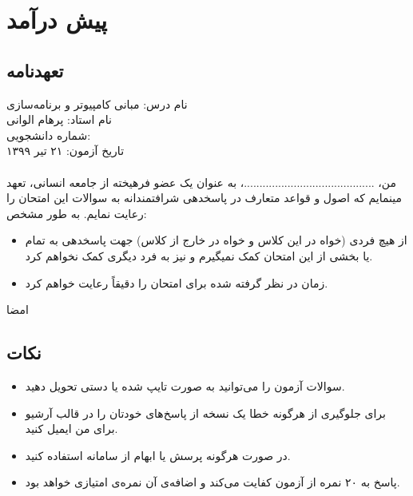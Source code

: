 \documentclass[../main.tex]{subfiles}
\begin{document}
\section{پیش درآمد}
\subsection{تعهدنامه}
نام درس:‌ مبانی کامپیوتر و برنامه‌سازی\\
نام استاد:‌ پرهام الوانی\\
شماره دانشجویی:‌ \hspace{2em}\\
تاریخ آزمون:‌ ۲۱ تیر ۱۳۹۹

\paragraph{}
من، ..........................................، به عنوان یک عضو فرهیخته از جامعه انسانی، تعهد مینمایم که اصول و قواعد متعارف در پاسخدهی
شرافتمندانه به سوالات این امتحان را رعایت نمایم. به طور مشخص:

\begin{itemize}
    \item  از هیچ فردی (خواه در این کلاس و خواه در خارج از کلاس) جهت پاسخدهی به تمام یا بخشی از این امتحان کمک نمیگیرم
    و نیز به فرد دیگری کمک نخواهم کرد.
    \item زمان در نظر گرفته شده برای امتحان را دقیقاً رعایت خواهم کرد.
\end{itemize}

امضا

\subsection{نکات}
\begin{itemize}
    \item سوالات آزمون را می‌توانید به صورت تایپ شده یا دستی تحویل دهید.
    \item برای جلوگیری از هرگونه خطا یک نسخه از پاسخ‌های خودتان را در قالب آرشیو برای من ایمیل کنید.
    \item در صورت هرگونه پرسش یا ابهام از سامانه  استفاده کنید.
    \item پاسخ به ۲۰ نمره از آزمون کفایت می‌کند و اضافه‌ی آن نمره‌ی امتیازی خواهد بود.
\end{itemize}
\end{document}
